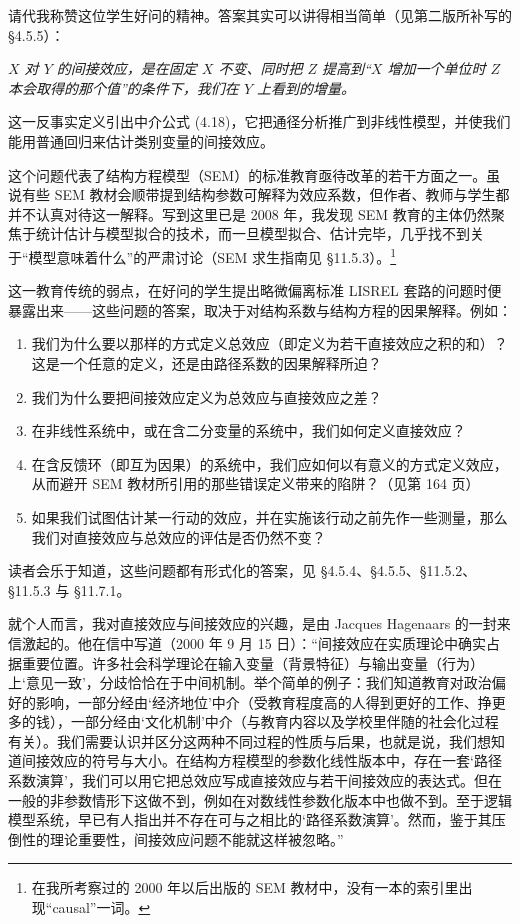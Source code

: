 请代我称赞这位学生好问的精神。答案其实可以讲得相当简单（见第二版所补写的 \S4.5.5）：

\emph{$X$ 对 $Y$ 的间接效应，是在固定 $X$ 不变、同时把 $Z$ 提高到“$X$ 增加一个单位时 $Z$ 本会取得的那个值”的条件下，我们在 $Y$ 上看到的增量。}

这一反事实定义引出中介公式 \textup{(4.18)}，它把通径分析推广到非线性模型，并使我们能用普通回归来估计类别变量的间接效应。


这个问题代表了结构方程模型（SEM）的标准教育亟待改革的若干方面之一。虽说有些 SEM 教材会顺带提到结构参数可解释为效应系数，但作者、教师与学生都并不认真对待这一解释。写到这里已是 2008 年，我发现 SEM 教育的主体仍然聚焦于统计估计与模型拟合的技术，而一旦模型拟合、估计完毕，几乎找不到关于“模型意味着什么”的严肃讨论（SEM 求生指南见 \S11.5.3）。\footnote{在我所考察过的 2000 年以后出版的 SEM 教材中，没有一本的索引里出现“causal”一词。}

这一教育传统的弱点，在好问的学生提出略微偏离标准 LISREL 套路的问题时便暴露出来——这些问题的答案，取决于对结构系数与结构方程的因果解释。例如：

\begin{enumerate}[label=\arabic*.,leftmargin=1.8em]
\item 我们为什么要以那样的方式定义总效应（即定义为若干直接效应之积的和）？这是一个任意的定义，还是由路径系数的因果解释所迫？
\item 我们为什么要把间接效应定义为总效应与直接效应之差？
\item 在非线性系统中，或在含二分变量的系统中，我们如何定义直接效应？
\item 在含反馈环（即互为因果）的系统中，我们应如何以有意义的方式定义效应，从而避开 SEM 教材所引用的那些错误定义带来的陷阱？（见第 164 页）
\item 如果我们试图估计某一行动的效应，并在实施该行动之前先作一些测量，那么我们对直接效应与总效应的评估是否仍然不变？
\end{enumerate}

读者会乐于知道，这些问题都有形式化的答案，见 \S4.5.4、\S4.5.5、\S11.5.2、\S11.5.3 与 \S11.7.1。

就个人而言，我对直接效应与间接效应的兴趣，是由 Jacques Hagenaars 的一封来信激起的。他在信中写道（2000 年 9 月 15 日）：“间接效应在实质理论中确实占据重要位置。许多社会科学理论在输入变量（背景特征）与输出变量（行为）上‘意见一致’，分歧恰恰在于中间机制。举个简单的例子：我们知道教育对政治偏好的影响，一部分经由‘经济地位’中介（受教育程度高的人得到更好的工作、挣更多的钱），一部分经由‘文化机制’中介（与教育内容以及学校里伴随的社会化过程有关）。我们需要认识并区分这两种不同过程的性质与后果，也就是说，我们想知道间接效应的符号与大小。在结构方程模型的参数化线性版本中，存在一套‘路径系数演算’，我们可以用它把总效应写成直接效应与若干间接效应的表达式。但在一般的非参数情形下这做不到，例如在对数线性参数化版本中也做不到。至于逻辑模型系统，早已有人指出并不存在可与之相比的‘路径系数演算’。然而，鉴于其压倒性的理论重要性，间接效应问题不能就这样被忽略。”

